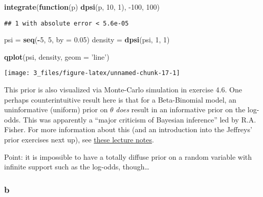 \documentclass[]{article}
\newenvironment{Shaded}{\begin{snugshade}}{\end{snugshade}}
\newcommand{\ControlFlowTok}[1]{\textcolor[rgb]{0.13,0.29,0.53}{\textbf{#1}}}
\newcommand{\DataTypeTok}[1]{\textcolor[rgb]{0.13,0.29,0.53}{#1}}
\newcommand{\DecValTok}[1]{\textcolor[rgb]{0.00,0.00,0.81}{#1}}
\newcommand{\FloatTok}[1]{\textcolor[rgb]{0.00,0.00,0.81}{#1}}
\newcommand{\KeywordTok}[1]{\textcolor[rgb]{0.13,0.29,0.53}{\textbf{#1}}}
\newcommand{\NormalTok}[1]{#1}
\newcommand{\OperatorTok}[1]{\textcolor[rgb]{0.81,0.36,0.00}{\textbf{#1}}}
\newcommand{\StringTok}[1]{\textcolor[rgb]{0.31,0.60,0.02}{#1}}
\begin{document}
\begin{Shaded}
\begin{Highlighting}[]
\KeywordTok{integrate}\NormalTok{(}\ControlFlowTok{function}\NormalTok{(p) }\KeywordTok{dpsi}\NormalTok{(p, }\DecValTok{10}\NormalTok{, }\DecValTok{1}\NormalTok{), }\DecValTok{-100}\NormalTok{, }\DecValTok{100}\NormalTok{)}
\end{Highlighting}
\end{Shaded}

\begin{verbatim}
## 1 with absolute error < 5.6e-05
\end{verbatim}

\begin{Shaded}
\begin{Highlighting}[]
\NormalTok{psi =}\StringTok{ }\KeywordTok{seq}\NormalTok{(}\OperatorTok{-}\DecValTok{5}\NormalTok{, }\DecValTok{5}\NormalTok{, }\DataTypeTok{by =} \FloatTok{0.05}\NormalTok{)}
\NormalTok{density =}\StringTok{ }\KeywordTok{dpsi}\NormalTok{(psi, }\DecValTok{1}\NormalTok{, }\DecValTok{1}\NormalTok{)}

\KeywordTok{qplot}\NormalTok{(psi, density, }\DataTypeTok{geom =} \StringTok{'line'}\NormalTok{)}
\end{Highlighting}
\end{Shaded}

\begin{center}\texttt{[image: 3\_files/figure-latex/unnamed-chunk-17-1]} \end{center}

This prior is also visualized via Monte-Carlo simulation in exercise
4.6. One perhaps counterintuitive result here is that for a
Beta-Binomial model, an uninformative (uniform) prior on \(\theta\)
\emph{does} result in an informative prior on the log-odds. This was
apparently a ``major criticism of Bayesian inference'' led by R.A.
Fisher. For more information about this (and an introduction into the
Jeffreys' prior exercises next up), see
\href{https://www2.stat.duke.edu/courses/Fall11/sta114/jeffreys.pdf}{these
lecture notes}.

Point: it is impossible to have a totally diffuse prior on a random
variable with infinite support such as the log-odds, though\ldots{}

\hypertarget{b-5}{%
\subsubsection{b}\label{b-5}}
\end{document}
